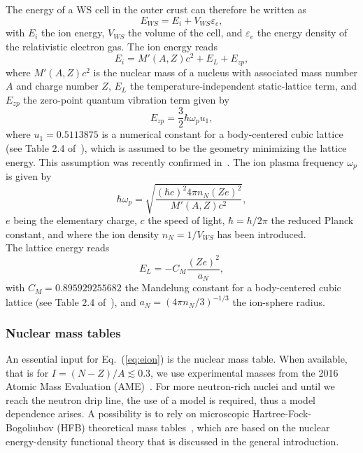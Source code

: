 The energy of a WS cell in the outer crust can therefore be written as
%
\begin{equation}
  E_{WS} = E_i + V_{WS}\varepsilon_e,\label{eq:ews_ocrust}
\end{equation}
%
with $E_i$ the ion energy, $V_{WS}$ the volume of the cell, and $\varepsilon_e$ the 
energy density of the relativistic electron gas.
The ion energy reads
%
\begin{equation}
  E_i = M'(A,Z)c^2 + E_L + E_{zp},\label{eq:eion}
\end{equation}
%
where $M'(A,Z)c^2$ is the nuclear mass of a nucleus with associated mass number 
$A$ and charge number $Z$, $E_L$ the temperature-independent static-lattice 
term, and $E_{zp}$ the zero-point quantum vibration term given by
%
\begin{equation}
  E_{zp} = \frac{3}{2}\hbar \omega_p u_1,\label{eq:ezp}
\end{equation}
%
where $u_1 = 0.5113875$ is a numerical constant for a body-centered cubic
lattice (see Table 2.4 of~\cite{Haensel2007}), 
which is assumed to be the geometry minimizing the lattice energy. This
assumption was recently confirmed in~\cite{Chamel2016}. The ion
plasma frequency $\omega_p$ is given by
%
\begin{equation}
  \hbar \omega_p = \sqrt{\frac{(\hbar c)^2 4\pi n_N
  (Ze)^2}{M'(A,Z)c^2}},\label{eq:omegap}
\end{equation}
%
$e$ being the elementary charge, $c$ the speed of light, $\hbar = h/2\pi$
the reduced Planck constant, and where the ion density $n_N = 1/V_{WS}$ has
been introduced.\\
The lattice energy reads
%
\begin{equation}
  E_L = -C_M \frac{(Ze)^2}{a_N},\label{eq:eL}
\end{equation}
%
with $C_M = 0.895929255682$ the Mandelung constant for a body-centered cubic 
lattice (see Table 2.4 of~\cite{Haensel2007}), and $a_N = (4\pi n_N/3)^{-1/3}$ 
the ion-sphere radius.

\subsubsection{Nuclear mass tables}

An essential input for Eq.~(\ref{eq:eion}) is the nuclear mass table. When
available, that is for $I = (N-Z)/A \lesssim 0.3$, we use experimental masses
from the 2016 Atomic Mass Evaluation (AME)~\cite{Huang2017}. For more neutron-rich
nuclei and until we reach the neutron drip line, the use of a model is
required, thus a model dependence arises. A possibility is to rely on 
microscopic Hartree-Fock-Bogoliubov (HFB) theoretical mass
tables~\cite{Samyn2002}, which are based on the nuclear energy-density 
functional theory that is discussed in the general introduction.


